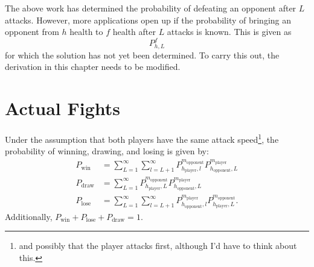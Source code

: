 			The above work has determined the probability of defeating an opponent after $L$ attacks. However, more applications open up if the probability of bringing an opponent from $h$ health to $f$ health after $L$ attacks is known. This is given as
			\begin{equation}
				P^f_{h, L}
			\end{equation}
			for which the solution has not yet been determined. To carry this out, the derivation in this chapter needs to be modified.

		\section{Actual Fights}
			Under the assumption that both players have the same attack speed\footnote{and possibly that the player attacks first, although I'd have to think about this.}, the probability of winning, drawing, and losing is given by:
			\begin{align}
				P_\text{win} &= \sum_{L=1}^\infty \sum_{l=L+1}^\infty P_{h_\text{player}, l}^{m_\text{opponent}} P_{h_\text{opponent}, L}^{m_\text{player}}\\
				P_\text{draw} &= \sum_{L=1}^\infty P_{h_\text{player}, L}^{m_\text{opponent}} P_{h_\text{opponent}, L}^{m_\text{player}}\\
				P_\text{lose} &= \sum_{L=1}^\infty \sum_{l=L+1}^\infty P_{h_\text{opponent}, l}^{m_\text{player}} P_{h_\text{player}, L}^{m_\text{opponent}}.
			\end{align}
			Additionally, $P_\text{win} + P_\text{lose} + P_\text{draw} = 1$.

